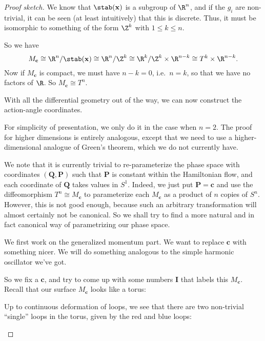 \documentclass[a4paper]{article}
\begin{document}
\begin{proof}[Proof sketch]
  We know that $\stab(\mathbf{x})$ is a subgroup of $\R^n$, and if the $g_i$ are non-trivial, it can be seen (at least intuitively) that this is discrete. Thus, it must be isomorphic to something of the form $\Z^k$ with $1 \leq k \leq n$.

  So we have
  \[
    M_\mathbf{c} \cong \R^n / \stab(\mathbf{x}) \cong \R^n/\Z^k \cong \R^k/\Z^k \times \R^{n - k} \cong T^k \times \R^{n - k}.
  \]
  Now if $M_\mathbf{c}$ is compact, we must have $n - k = 0$, i.e.\ $n = k$, so that we have no factors of $\R$. So $M_\mathbf{c} \cong T^n$.

  \separator

  With all the differential geometry out of the way, we can now construct the action-angle coordinates.

  For simplicity of presentation, we only do it in the case when $n = 2$. The proof for higher dimensions is entirely analogous, except that we need to use a higher-dimensional analogue of Green's theorem, which we do not currently have.

  We note that it is currently trivial to re-parameterize the phase space with coordinates $(\mathbf{Q}, \mathbf{P})$ such that $\mathbf{P}$ is constant within the Hamiltonian flow, and each coordinate of $\mathbf{Q}$ takes values in $S^1$. Indeed, we just put $\mathbf{P} = \mathbf{c}$ and use the diffeomorphism $T^n \cong M_\mathbf{c}$ to parameterize each $M_\mathbf{c}$ as a product of $n$ copies of $S^n$. However, this is not good enough, because such an arbitrary transformation will almost certainly not be canonical. So we shall try to find a more natural and in fact canonical way of parametrizing our phase space.

  We first work on the generalized momentum part. We want to replace $\mathbf{c}$ with something nicer. We will do something analogous to the simple harmonic oscillator we've got.

  So we fix a $\mathbf{c}$, and try to come up with some numbers $\mathbf{I}$ that labels this $M_\mathbf{c}$. Recall that our surface $M_\mathbf{c}$ looks like a torus:
  \begin{center}
  \end{center}
  Up to continuous deformation of loops, we see that there are two non-trivial ``single'' loops in the torus, given by the red and blue loops:
  \begin{center}
\end{center}
\end{proof}
\end{document}
